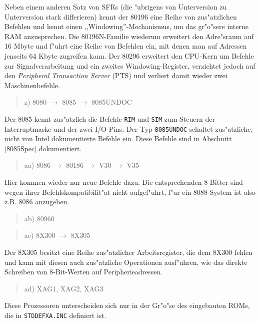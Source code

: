\documentclass[12pt,a4paper,twoside]{report}
\newcommand{\tty}[1]{{\tt #1}}
\begin{document}
Neben einem anderen Satz von SFRs (die "ubrigens von Unterversion zu
Unterversion stark differieren) kennt der 80196 eine Reihe von
zus"atzlichen Befehlen und kennt einen ,,Windowing''-Mechanismus, um
das gr"o"sere interne RAM anzusprechen.  Die 80196N-Familie wiederum
erweitert den Adre"sraum auf 16 Mbyte und f"uhrt eine Reihe von
Befehlen ein, mit denen man auf Adressen jenseits 64 Kbyte zugreifen
kann.  Der 80296 erweitert den CPU-Kern um Befehle zur Signalverarbeitung
und ein zweites Windowing-Register, verzichtet jedoch auf den {\em
Peripheral Transaction Server} (PTS) und verliert damit wieder zwei
Maschinenbefehle.
\begin{quote}
z) 8080 $\rightarrow$ 8085 $\rightarrow$ 8085UNDOC
\end{quote}
Der 8085 kennt zus"atzlich die Befehle \tty{RIM} und \tty{SIM} zum Steuern der
Interruptmaske und der zwei I/O-Pins.  Der Typ {\tt 8085UNDOC} schaltet
zus"atzliche, nicht von Intel dokumentierte Befehle ein.  Diese Befehle
sind in Abschnitt \ref{8085Spec} dokumentiert.
\begin{quote}
aa) 8086 $\rightarrow$ 80186 $\rightarrow$ V30 $\rightarrow$ V35
\end{quote}
Hier kommen wieder nur neue Befehle dazu.  Die entsprechenden 8-Bitter sind
wegen ihrer Befehlskompatibilit"at nicht aufgef"uhrt, f"ur ein 8088-System
ist also z.B. 8086 anzugeben.
\begin{quote}
ab) 80960
\end{quote}
\begin{quote}
ac) 8X300 $\rightarrow$ 8X305
\end{quote}
Der 8X305 besitzt eine Reihe zus"atzlicher Arbeitsregister, die dem
8X300 fehlen und kann mit diesen auch zus"atzliche Operationen ausf"uhren,
wie das direkte Schreiben von 8-Bit-Werten auf Peripherieadressen.
\begin{quote}
ad) XAG1, XAG2, XAG3
\end{quote}
Diese Prozessoren unterscheiden sich nur in der Gr"o"se des eingebauten
ROMs, die in \tty{STDDEFXA.INC} definiert ist.
\end{document}
